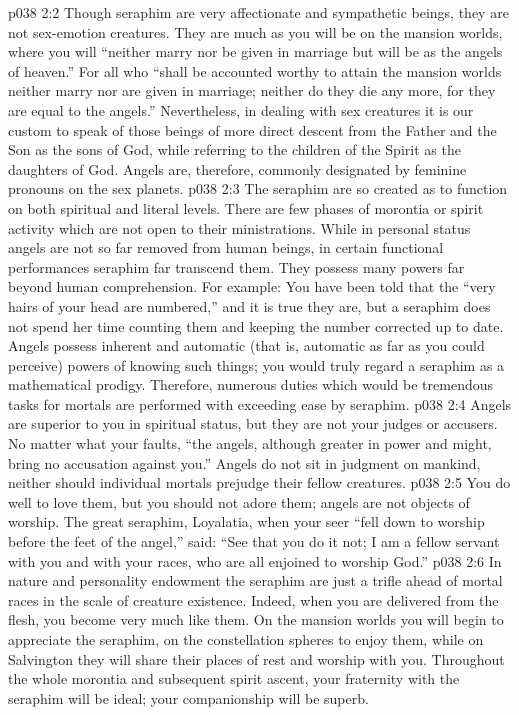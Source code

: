 \vs p038 2:2 \pc Though seraphim are very affectionate and sympathetic beings, they are not sex\hyp{}emotion creatures. They are much as you will be on the mansion worlds, where you will “neither marry nor be given in marriage but will be as the angels of heaven.” For all who “shall be accounted worthy to attain the mansion worlds neither marry nor are given in marriage; neither do they die any more, for they are equal to the angels.” Nevertheless, in dealing with sex creatures it is our custom to speak of those beings of more direct descent from the Father and the Son as the sons of God, while referring to the children of the Spirit as the daughters of God. Angels are, therefore, commonly designated by feminine pronouns on the sex planets.
\vs p038 2:3 The seraphim are so created as to function on both spiritual and literal levels. There are few phases of morontia or spirit activity which are not open to their ministrations. While in personal status angels are not so far removed from human beings, in certain functional performances seraphim far transcend them. They possess many powers far beyond human comprehension. For example: You have been told that the “very hairs of your head are numbered,” and it is true they are, but a seraphim does not spend her time counting them and keeping the number corrected up to date. Angels possess inherent and automatic (that is, automatic as far as you could perceive) powers of knowing such things; you would truly regard a seraphim as a mathematical prodigy. Therefore, numerous duties which would be tremendous tasks for mortals are performed with exceeding ease by seraphim.
\vs p038 2:4 \pc Angels are superior to you in spiritual status, but they are not your judges or accusers. No matter what your faults, “the angels, although greater in power and might, bring no accusation against you.” Angels do not sit in judgment on mankind, neither should individual mortals prejudge their fellow creatures.
\vs p038 2:5 \pc You do well to love them, but you should not adore them; angels are not objects of worship. The great seraphim, Loyalatia, when your seer “fell down to worship before the feet of the angel,” said: “See that you do it not; I am a fellow servant with you and with your races, who are all enjoined to worship God.”
\vs p038 2:6 In nature and personality endowment the seraphim are just a trifle ahead of mortal races in the scale of creature existence. Indeed, when you are delivered from the flesh, you become very much like them. On the mansion worlds you will begin to appreciate the seraphim, on the constellation spheres to enjoy them, while on Salvington they will share their places of rest and worship with you. Throughout the whole morontia and subsequent spirit ascent, your fraternity with the seraphim will be ideal; your companionship will be superb.
